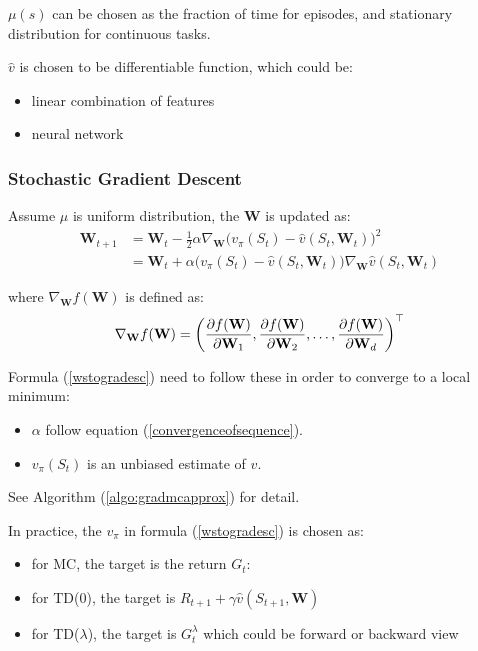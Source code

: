 $\mu(s)$ can be chosen as the fraction of time for episodes, and stationary distribution for continuous tasks.

$\widehat{v}$ is chosen to be differentiable function, which could be:
\begin{itemize}
	\item linear combination of features
	\item neural network
\end{itemize}

\subsubsection{Stochastic Gradient Descent}

Assume $\mu$ is uniform distribution, the $\mathbf{W}$ is updated as:
\begin{equation}\label{wstogradesc}
	\begin{aligned}
		\mathbf{W}_{t+1} &= \mathbf{W}_t - \frac{1}{2} \alpha \nabla_{\mathbf{W}} \Big ( v_\pi(S_t) - \widehat{v}(S_t, \mathbf{W}_t) \Big )^2 \\
		&= \mathbf{W}_t+ \alpha \Big ( v_\pi(S_t) - \widehat{v}(S_t, \mathbf{W}_t) \Big ) \nabla_{\mathbf{W}}  \widehat{v}(S_t, \mathbf{W}_t) 
	\end{aligned}
\end{equation}

where $\nabla_{\mathbf{W}} f(\mathbf{W})$ is defined as:
\begin{equation}
	\nabla_{\mathbf{W}} f(\mathbf{W}) = \mleft( \frac{\partial f(\mathbf{W})}{\partial \mathbf{W}_1}, \frac{\partial f(\mathbf{W})}{\partial \mathbf{W}_2}, \dots, \frac{\partial f(\mathbf{W})}{\partial \mathbf{W}_d}  \mright)^{\top}
\end{equation}

 Formula (\ref{wstogradesc}) need to follow these in order to converge to a local minimum:
\begin{itemize}
	\item $\alpha$ follow equation (\ref{convergenceofsequence}).
	\item $v_\pi(S_t) $ is an unbiased estimate of $v$.
\end{itemize}




See Algorithm (\ref{algo:gradmcapprox}) for detail.

In practice, the $v_\pi$ in formula (\ref{wstogradesc}) is chosen as:
\begin{itemize}
	\item for MC, the target is the return $G_t$:
	\item for TD(0), the target is $R_{t+1} + \gamma \widehat{v}(S_{t+1}, \mathbf{W} )$
	\item for TD($\lambda$), the target is $G_t^\lambda$ which could be forward or backward view
\end{itemize}


